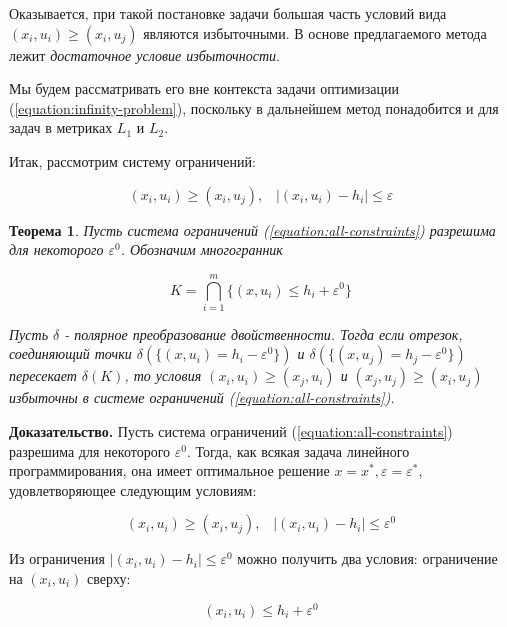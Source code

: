 \documentclass[a4paper, 10pt]{article}
\theoremstyle{definition}
\theoremstyle{plain}
\newtheorem{SmartTheorem}{Теорема}
\theoremstyle{plain}
\begin{document}
Оказывается, при такой постановке задачи большая часть условий вида
$(x_{i}, u_{i}) \geq (x_{i}, u_{j})$ являются избыточными.
В основе предлагаемого метода лежит \textit{достаточное условие избыточности}.

Мы будем рассматривать его вне контекста задачи оптимизации
(\ref{equation:infinity-problem}), поскольку в дальнейшем метод понадобится и
для задач в метриках $L_{1}$ и $L_{2}$.

Итак, рассмотрим систему ограничений:

\begin{equation}
\label{equation:all-constraints}
 (x_{i}, u_{i}) \geq (x_{i}, u_{j}), \;\;\;
 |(x_{i}, u_{i}) - h_{i}| \leq \varepsilon
\end{equation}

\begin{SmartTheorem}\label{theorem:exhaustive-conditions}
Пусть система ограничений (\ref{equation:all-constraints}) разрешима
для некоторого $\varepsilon^{0}$. Обозначим многогранник

\begin{equation}
\label{equation:upper-bounds-polyhedron}
 K = \bigcap \limits_{i = 1}^{m}\{(x, u_{i}) \leq h_{i} + \varepsilon^{0}\}
\end{equation}

Пусть $\delta$ - полярное преобразование двойственности.
Тогда если отрезок, соединяющий точки
$\delta(\{(x, u_{i}) = h_{i} - \varepsilon^{0}\})$ и
$\delta(\{(x, u_{j}) = h_{j} - \varepsilon^{0}\})$ пересекает
$\delta(K)$, то условия $(x_{i}, u_{i}) \geq (x_{j}, u_{i})$ и
$(x_{j}, u_{j}) \geq (x_{i}, u_{j})$ избыточны в системе ограничений
(\ref{equation:all-constraints}).
\end{SmartTheorem}

\textbf{Доказательство.}
Пусть система ограничений (\ref{equation:all-constraints}) разрешима
для некоторого $\varepsilon^{0}$. Тогда, как всякая задача линейного
программирования, она имеет оптимальное решение
$x = x^{*}, \varepsilon = \varepsilon^{*}$, удовлетворяющее следующим условиям:

\begin{equation*}
 (x_{i}, u_{i}) \geq (x_{i}, u_{j}), \;\;\;
 |(x_{i}, u_{i}) - h_{i}| \leq \varepsilon^{0}
\end{equation*}

Из ограничения  $|(x_{i}, u_{i}) - h_{i}| \leq \varepsilon^{0}$ можно
получить два условия: ограничение на $(x_{i}, u_{i})$ сверху:

\begin{equation*}
 (x_{i}, u_{i}) \leq h_{i} + \varepsilon^{0}
\end{equation*}
\end{document}
